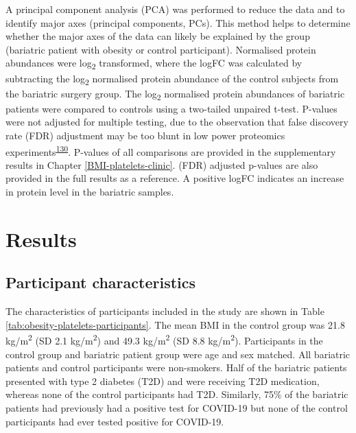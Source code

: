 \documentclass[11pt,twoside]{bristolthesis}
\begin{document}
A principal component analysis (PCA) was performed to reduce the data and to identify major axes (principal components, PCs). This method helps to determine whether the major axes of the data can likely be explained by the group (bariatric patient with obesity or control participant). Normalised protein abundances were log\textsubscript{2} transformed, where the logFC was calculated by subtracting the log\textsubscript{2} normalised protein abundance of the control subjects from the bariatric surgery group. The log\textsubscript{2} normalised protein abundances of bariatric patients were compared to controls using a two-tailed unpaired t-test. P-values were not adjusted for multiple testing, due to the observation that false discovery rate (FDR) adjustment may be too blunt in low power proteomics experiments\textsuperscript{\protect\hyperlink{ref-Pascovici2016}{130}}. P-values of all comparisons are provided in the supplementary results in Chapter \ref{BMI-platelets-clinic}. (FDR) adjusted p-values are also provided in the full results as a reference. A positive logFC indicates an increase in protein level in the bariatric samples.

\hypertarget{results-1}{%
\section{Results}\label{results-1}}

\hypertarget{participant-characteristics}{%
\subsection{Participant characteristics}\label{participant-characteristics}}

The characteristics of participants included in the study are shown in Table \ref{tab:obesity-platelets-participants}. The mean BMI in the control group was 21.8 kg/m\textsuperscript{2} (SD 2.1 kg/m\textsuperscript{2}) and 49.3 kg/m\textsuperscript{2} (SD 8.8 kg/m\textsuperscript{2}). Participants in the control group and bariatric patient group were age and sex matched. All bariatric patients and control participants were non-smokers. Half of the bariatric patients presented with type 2 diabetes (T2D) and were receiving T2D medication, whereas none of the control participants had T2D. Similarly, 75\% of the bariatric patients had previously had a positive test for COVID-19 but none of the control participants had ever tested positive for COVID-19.
\end{document}
